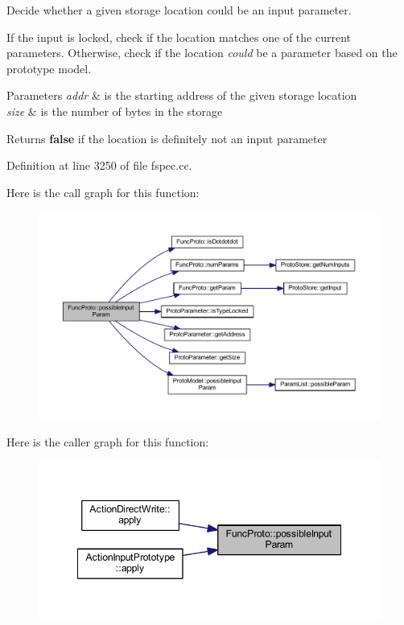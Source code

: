 Decide whether a given storage location could be an input parameter. 

If the input is locked, check if the location matches one of the current parameters. Otherwise, check if the location {\itshape could} be a parameter based on the prototype model. 
\begin{DoxyParams}{Parameters}
{\em addr} & is the starting address of the given storage location \\
\hline
{\em size} & is the number of bytes in the storage \\
\hline
\end{DoxyParams}
\begin{DoxyReturn}{Returns}
{\bfseries{false}} if the location is definitely not an input parameter 
\end{DoxyReturn}


Definition at line 3250 of file fspec.\+cc.

Here is the call graph for this function\+:
\nopagebreak
\begin{figure}[H]
\begin{center}
\leavevmode
\includegraphics[width=350pt]{class_func_proto_a59ed6ca81a4b601ae81f4080a5bf89fa_cgraph}
\end{center}
\end{figure}
Here is the caller graph for this function\+:
\nopagebreak
\begin{figure}[H]
\begin{center}
\leavevmode
\includegraphics[width=348pt]{class_func_proto_a59ed6ca81a4b601ae81f4080a5bf89fa_icgraph}
\end{center}
\end{figure}
\mbox{\label{class_func_proto_a65c37f6adddd70f3fd17500dcacd0c92}} 
